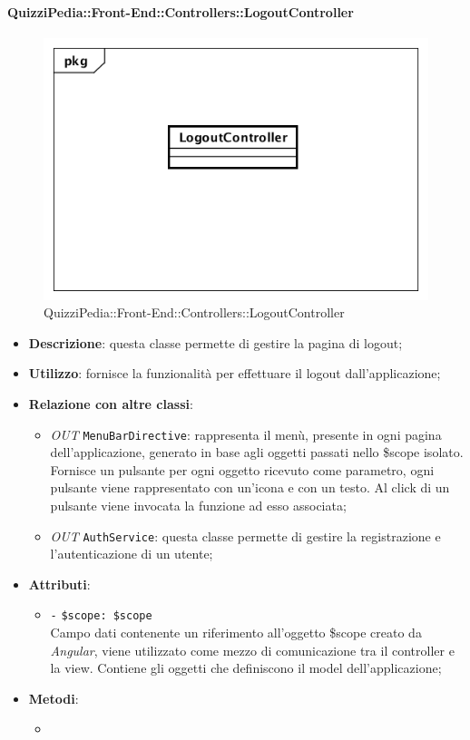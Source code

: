 \paragraph{QuizziPedia::Front-End::Controllers::LogoutController}
\begin{figure}
	\centering
	\includegraphics[scale=0.45]{UML/Classi/Front-End/QuizziPedia_Front-end_Controller_LogoutController.png}
	\caption{QuizziPedia::Front-End::Controllers::LogoutController}
\end{figure}
\begin{itemize}
	\item \textbf{Descrizione}: questa classe permette di gestire la pagina di logout;
	\item \textbf{Utilizzo}: fornisce la funzionalità per effettuare il logout dall'applicazione;
	\item \textbf{Relazione con altre classi}:
	\begin{itemize}
		\item \textit{OUT} \texttt{MenuBarDirective}: rappresenta il menù, presente in ogni pagina dell'applicazione, generato in base agli oggetti passati nello \$scope isolato. Fornisce un pulsante per ogni oggetto ricevuto come parametro, ogni pulsante viene rappresentato con un’icona e con un testo. Al click di un pulsante viene invocata la funzione ad esso associata;
		\item \textit{OUT} \texttt{AuthService}: questa classe permette di gestire la registrazione e l'autenticazione di un utente;
	\end{itemize}
	\item \textbf{Attributi}:
	\begin{itemize}
		\item \texttt{-} \texttt{\$scope: \$scope} \\
		Campo dati contenente un riferimento all’oggetto \$scope creato da \textit{Angular}, viene utilizzato come mezzo di comunicazione tra il controller e la view. Contiene gli oggetti che definiscono il model dell’applicazione;
	\end{itemize}
	\item \textbf{Metodi}:
	\begin{itemize}
		\item 
	\end{itemize}
\end{itemize}


